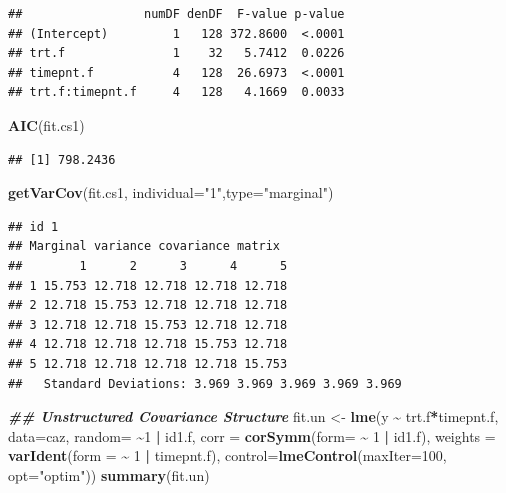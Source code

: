 \documentclass[
]{book}
\newenvironment{Shaded}{\begin{snugshade}}{\end{snugshade}}
\newcommand{\AttributeTok}[1]{\textcolor[rgb]{0.13,0.29,0.53}{#1}}
\newcommand{\DecValTok}[1]{\textcolor[rgb]{0.00,0.00,0.81}{#1}}
\newcommand{\DocumentationTok}[1]{\textcolor[rgb]{0.56,0.35,0.01}{\textbf{\textit{#1}}}}
\newcommand{\FunctionTok}[1]{\textcolor[rgb]{0.13,0.29,0.53}{\textbf{#1}}}
\newcommand{\NormalTok}[1]{#1}
\newcommand{\OtherTok}[1]{\textcolor[rgb]{0.56,0.35,0.01}{#1}}
\newcommand{\SpecialCharTok}[1]{\textcolor[rgb]{0.81,0.36,0.00}{\textbf{#1}}}
\newcommand{\StringTok}[1]{\textcolor[rgb]{0.31,0.60,0.02}{#1}}
\begin{document}
\begin{verbatim}
##                 numDF denDF  F-value p-value
## (Intercept)         1   128 372.8600  <.0001
## trt.f               1    32   5.7412  0.0226
## timepnt.f           4   128  26.6973  <.0001
## trt.f:timepnt.f     4   128   4.1669  0.0033
\end{verbatim}

\begin{Shaded}
\begin{Highlighting}[]
\FunctionTok{AIC}\NormalTok{(fit.cs1)}
\end{Highlighting}
\end{Shaded}

\begin{verbatim}
## [1] 798.2436
\end{verbatim}

\begin{Shaded}
\begin{Highlighting}[]
\FunctionTok{getVarCov}\NormalTok{(fit.cs1, }\AttributeTok{individual=}\StringTok{"1"}\NormalTok{,}\AttributeTok{type=}\StringTok{"marginal"}\NormalTok{)}
\end{Highlighting}
\end{Shaded}

\begin{verbatim}
## id 1 
## Marginal variance covariance matrix
##        1      2      3      4      5
## 1 15.753 12.718 12.718 12.718 12.718
## 2 12.718 15.753 12.718 12.718 12.718
## 3 12.718 12.718 15.753 12.718 12.718
## 4 12.718 12.718 12.718 15.753 12.718
## 5 12.718 12.718 12.718 12.718 15.753
##   Standard Deviations: 3.969 3.969 3.969 3.969 3.969
\end{verbatim}

\begin{Shaded}
\begin{Highlighting}[]
\DocumentationTok{\#\# Unstructured Covariance Structure }
\NormalTok{fit.un }\OtherTok{\textless{}{-}} \FunctionTok{lme}\NormalTok{(y }\SpecialCharTok{\textasciitilde{}}\NormalTok{ trt.f}\SpecialCharTok{*}\NormalTok{timepnt.f, }\AttributeTok{data=}\NormalTok{caz,}
  \AttributeTok{random=} \SpecialCharTok{\textasciitilde{}}\DecValTok{1} \SpecialCharTok{|}\NormalTok{ id1.f,}
  \AttributeTok{corr =} \FunctionTok{corSymm}\NormalTok{(}\AttributeTok{form=} \SpecialCharTok{\textasciitilde{}} \DecValTok{1} \SpecialCharTok{|}\NormalTok{ id1.f),}
  \AttributeTok{weights =} \FunctionTok{varIdent}\NormalTok{(}\AttributeTok{form =} \SpecialCharTok{\textasciitilde{}} \DecValTok{1} \SpecialCharTok{|}\NormalTok{ timepnt.f), }
  \AttributeTok{control=}\FunctionTok{lmeControl}\NormalTok{(}\AttributeTok{maxIter=}\DecValTok{100}\NormalTok{, }\AttributeTok{opt=}\StringTok{"optim"}\NormalTok{))}
\FunctionTok{summary}\NormalTok{(fit.un)}
\end{Highlighting}
\end{Shaded}
\end{document}
